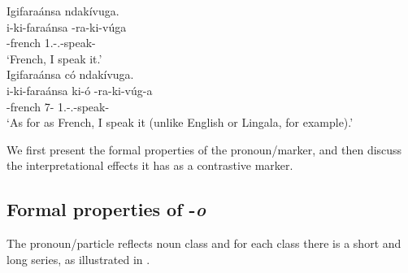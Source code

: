 \documentclass[output=paper]{langscibook}
\begin{document}
\ea
\label{bkm:Ref74930350}
\ea
\label{bkm:Ref74930350:a}
Igifaraánsa ndakívuga.\\
\gll
i-ki-faraánsa  \N{}-ra-ki-vúga\\
-{}french  1\SG.\SM-\PRS.\OM{}-speak-\FV{}\\
\glt
‘French, I speak it.’\\

\ex
\label{bkm:Ref74930350:b}
Igifaraánsa có ndakívuga.\\
\gll
i-ki-faraánsa  ki-ó  \N{}-ra-ki-vúg-a\\
-{}french  7-\CM{}  1\SG.\SM-\PRS.\OM{}-speak-\FV{}\\
\glt
‘As for as French, I speak it (unlike English or Lingala, for example).’\\

\z
\z

We first present the formal properties of the pronoun/marker, and then discuss the interpretational effects it has as a contrastive marker.

\subsection{Formal properties of -\textit{o}}
\largerpage

The pronoun/particle reflects noun class and for each class there is a short and long series, as illustrated in .
\end{document}

